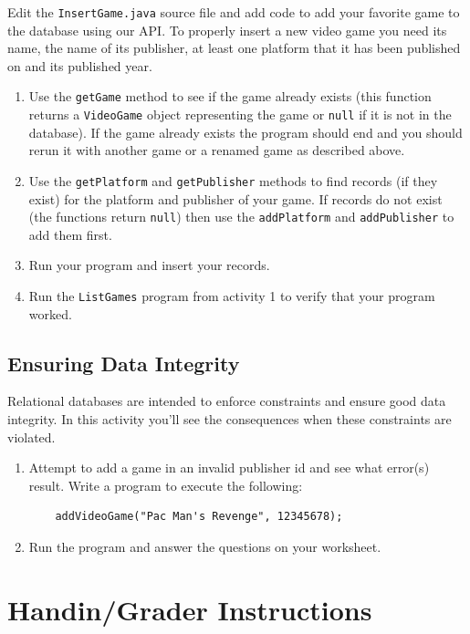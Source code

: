 \documentclass[12pt]{scrartcl}
\begin{document}
Edit the \texttt{InsertGame.java} source file and add code 
to add your favorite game to the database using our API.  To properly 
insert a new video game you need its name, the name of its publisher, 
at least one platform that it has been published on and its published 
year.
\begin{enumerate}
  \item Use the \texttt{getGame} method to see if the game 
  	already exists (this function returns a \texttt{VideoGame} 
	object representing the game or \texttt{null} if it is not 
	in the database).  If the game already exists the program should 
	end and you should rerun it with another game or a renamed 
	game as described above.
  \item Use the \texttt{getPlatform} and \texttt{getPublisher} 
	methods to find records (if they exist) for the platform and publisher 
	of your game.  If records do not exist (the functions return \texttt{null}) 
	then use the \texttt{addPlatform} and \texttt{addPublisher} 
	to add them first.
  \item Run your program and insert your records.
  \item Run the \texttt{ListGames} program from activity 1 to 
  	verify that your program worked.  
\end{enumerate}

\subsection{Ensuring Data Integrity}

Relational databases are intended to enforce constraints and ensure 
good data integrity.  In this activity you'll see the consequences when 
these constraints are violated.
\begin{enumerate}
  \item Attempt to add a game in an invalid publisher id and see what 
	error(s) result.  Write a program to execute the following:
	
	\begin{verbatim}
	addVideoGame("Pac Man's Revenge", 12345678);
	\end{verbatim}
  \item Run the program and answer the questions on your worksheet.
\end{enumerate}

\section{Handin/Grader Instructions}
\end{document}
